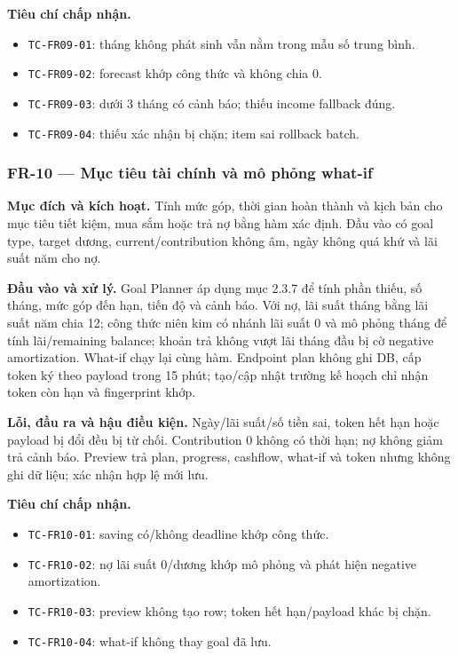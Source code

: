 \textbf{Tiêu chí chấp nhận.}
\begin{itemize}
  \item \texttt{TC-FR09-01}: tháng không phát sinh vẫn nằm trong mẫu số trung bình.
  \item \texttt{TC-FR09-02}: forecast khớp công thức và không chia 0.
  \item \texttt{TC-FR09-03}: dưới 3 tháng có cảnh báo; thiếu income fallback đúng.
  \item \texttt{TC-FR09-04}: thiếu xác nhận bị chặn; item sai rollback batch.
\end{itemize}

\subsubsection{FR-10 --- Mục tiêu tài chính và mô phỏng what-if}

\textbf{Mục đích và kích hoạt.} Tính mức góp, thời gian hoàn thành và kịch bản cho mục tiêu tiết kiệm, mua sắm hoặc trả nợ bằng hàm xác định. Đầu vào có goal type, target dương, current/contribution không âm, ngày không quá khứ và lãi suất năm cho nợ.

\textbf{Đầu vào và xử lý.} Goal Planner áp dụng mục 2.3.7 để tính phần thiếu, số tháng, mức góp đến hạn, tiến độ và cảnh báo. Với nợ, lãi suất tháng bằng lãi suất năm chia 12; công thức niên kim có nhánh lãi suất 0 và mô phỏng tháng để tính lãi/remaining balance; khoản trả không vượt lãi tháng đầu bị cờ negative amortization. What-if chạy lại cùng hàm. Endpoint plan không ghi DB, cấp token ký theo payload trong 15 phút; tạo/cập nhật trường kế hoạch chỉ nhận token còn hạn và fingerprint khớp.

\textbf{Lỗi, đầu ra và hậu điều kiện.} Ngày/lãi suất/số tiền sai, token hết hạn hoặc payload bị đổi đều bị từ chối. Contribution 0 không có thời hạn; nợ không giảm trả cảnh báo. Preview trả plan, progress, cashflow, what-if và token nhưng không ghi dữ liệu; xác nhận hợp lệ mới lưu.

\textbf{Tiêu chí chấp nhận.}
\begin{itemize}
  \item \texttt{TC-FR10-01}: saving có/không deadline khớp công thức.
  \item \texttt{TC-FR10-02}: nợ lãi suất 0/dương khớp mô phỏng và phát hiện negative amortization.
  \item \texttt{TC-FR10-03}: preview không tạo row; token hết hạn/payload khác bị chặn.
  \item \texttt{TC-FR10-04}: what-if không thay goal đã lưu.
\end{itemize}

